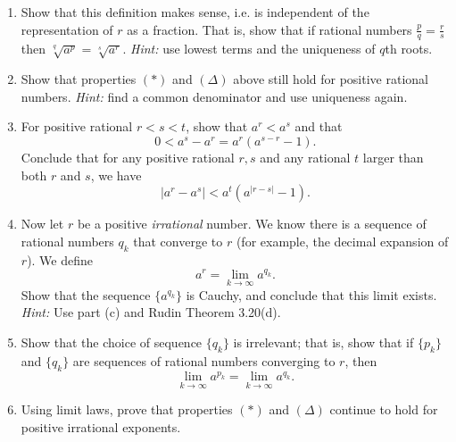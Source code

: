 \documentclass[11pt]{article}
\begin{document}
    \begin{enumerate}[label=(\alph*)]
        \item 
        Show that this definition makes sense, i.e. is independent of the representation of $r$ as a fraction. That is, show that if rational numbers $\frac{p}{q} = \frac{r}{s}$ then $\sqrt[q]{a^p} = \sqrt[s]{a^r}$. \textit{Hint:} use lowest terms and the uniqueness of $q$th roots.

        \item 
        Show that properties $(\ast)$ and $(\Delta)$ above still hold for positive rational numbers. \textit{Hint:} find a common denominator and use uniqueness again.

        \item 
        For positive rational $r < s < t$, show that $a^r < a^s$ and that
        \begin{equation*}
            0 < a^s - a^r = a^r(a^{s - r} - 1).
        \end{equation*}
        Conclude that for any positive rational $r, s$ and any rational $t$ larger than both $r$ and $s$, we have
        \begin{equation*}
            |a^r - a^s| < a^t(a^{|r - s|} - 1).
        \end{equation*}

        \item 
        Now let $r$ be a positive \textit{irrational} number. We know there is a sequence of rational numbers $q_k$ that converge to $r$ (for example, the decimal expansion of $r$). We define
        \begin{equation*}
            a^r = \lim_{k \to \infty} a^{q_k}.
        \end{equation*}
        Show that the sequence $\{a^{q_k}\}$ is Cauchy, and conclude that this limit exists.\\ \textit{Hint:} Use part (c) and Rudin Theorem 3.20(d).
        
        \item
        Show that the choice of sequence $\{q_k\}$ is irrelevant; that is, show that if $\{p_k\}$ and $\{q_k\}$ are sequences of rational numbers converging to $r$, then 
        \begin{equation*}
            \lim_{k \to \infty} a^{p_k} = \lim_{k \to \infty} a^{q_k}.
        \end{equation*}

        \item 
        Using limit laws, prove that properties $(\ast)$ and $(\Delta)$ continue to hold for positive irrational exponents.
        
    \end{enumerate}
\end{document}

